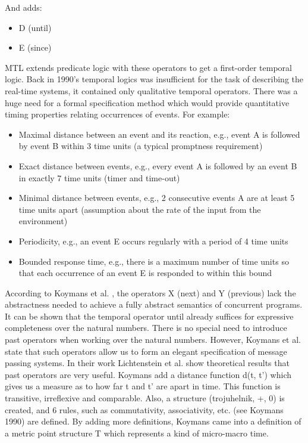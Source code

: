 And adds:

\begin{itemize}
    \item D (until)
    \item E (since)
\end{itemize}

MTL extends predicate logic with these operators to get a first-order temporal logic. Back in 1990’s temporal logics was insufficient for the task of describing the real-time systems, it contained only qualitative temporal operators. There was a huge need for a formal specification method which would provide quantitative timing properties relating occurrences of events. For example:

\begin{itemize}
    \item Maximal distance between an event and its reaction, e.g., event A is followed by event B within 3 time units (a typical promptness requirement)
    \item Exact distance between events, e.g., every event A is followed by an event B in exactly 7 time units (timer and time-out)
    \item Minimal distance between events, e.g., 2 consecutive events A are at least 5 time units apart (assumption about the rate of the input from the environment)
    \item Periodicity, e.g., an event E occurs regularly with a period of 4 time units
    \item Bounded response time, e.g., there is a maximum number of time units so that each occurrence of an event E is responded to within this bound
\end{itemize}

According to Koymans et al. \cite{Koymans:RealTimeProgramming}, the operators X (next) and Y (previous) lack the abstractness needed to achieve a fully abstract semantics of concurrent programs. It can be shown that the temporal operator until already suffices for expressive completeness over the natural numbers. There is no special need to introduce past operators when working over the natural numbers. However, Koymans et al. state that such operators allow us to form an elegant specification of message passing systems. In their work Lichtenstein et al. \cite{Lichtenstein:LogicOfPrograms} show theoretical results that past operators are very useful. Koymans add a distance function d(t, t’) which gives us a measure as to how far t and t’ are apart in time. This function is transitive, irreflexive and comparable. Also, a structure (trojuhelnik, +, 0) is created, and 6 rules, such as commutativity, associativity, etc. (see Koymans 1990) are defined. By adding more definitions, Koymans came into a definition of a metric point structure T which represents a kind of micro-macro time. 


